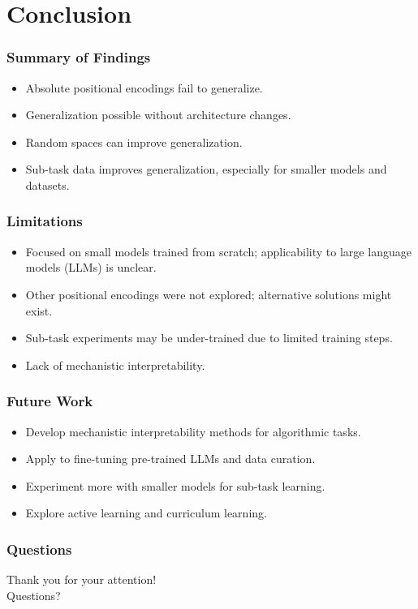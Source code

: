 \documentclass[14pt,aspectratio=169]{beamer}
\theoremstyle{remark}
\begin{document}
\section{Conclusion}

\begin{frame}
    \frametitle{Summary of Findings}
    \begin{itemize}
        \item Absolute positional encodings fail to generalize.
        \item Generalization possible without architecture changes.
        \item Random spaces can improve generalization.
        \item Sub-task data improves generalization, especially for smaller models and datasets.
    \end{itemize}
\end{frame}

\begin{frame}
    \frametitle{Limitations}
    \begin{itemize}
        \item Focused on small models trained from scratch; applicability to large language models (LLMs) is unclear.
        \item Other positional encodings were not explored; alternative solutions might exist.
        \item Sub-task experiments may be under-trained due to limited training steps.
        \item Lack of mechanistic interpretability.
    \end{itemize}
\end{frame}

\begin{frame}
    \frametitle{Future Work}
    \begin{itemize}
        \item Develop mechanistic interpretability methods for algorithmic tasks.
        \item Apply to fine-tuning pre-trained LLMs and data curation.
        \item Experiment more with smaller models for sub-task learning.
        \item Explore active learning and curriculum learning.
    \end{itemize}
\end{frame}

\begin{frame}
    \frametitle{Questions}
    \centering
    Thank you for your attention! \\
    \vspace{1cm}
    Questions?
\end{frame}
\end{document}
